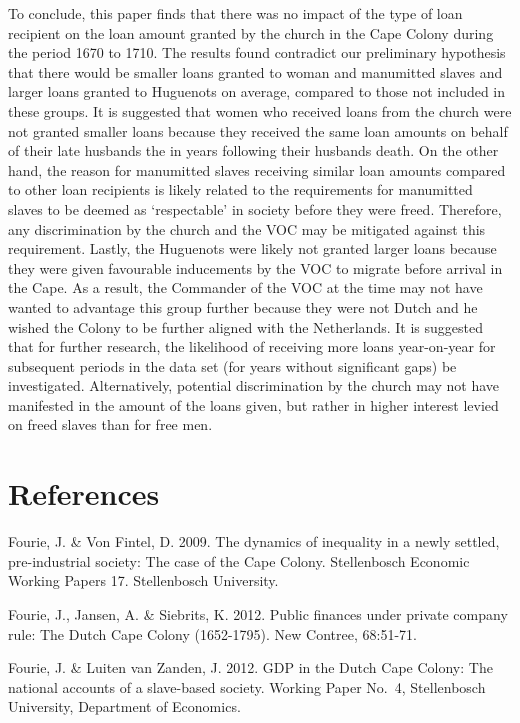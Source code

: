 \documentclass[11pt,preprint, authoryear]{elsarticle}
\numberwithin{equation}{section}
\numberwithin{figure}{section}
\numberwithin{table}{section}
\begin{document}
To conclude, this paper finds that there was no impact of the type of
loan recipient on the loan amount granted by the church in the Cape
Colony during the period 1670 to 1710. The results found contradict our
preliminary hypothesis that there would be smaller loans granted to
woman and manumitted slaves and larger loans granted to Huguenots on
average, compared to those not included in these groups. It is suggested
that women who received loans from the church were not granted smaller
loans because they received the same loan amounts on behalf of their
late husbands the in years following their husbands death. On the other
hand, the reason for manumitted slaves receiving similar loan amounts
compared to other loan recipients is likely related to the requirements
for manumitted slaves to be deemed as `respectable' in society before
they were freed. Therefore, any discrimination by the church and the VOC
may be mitigated against this requirement. Lastly, the Huguenots were
likely not granted larger loans because they were given favourable
inducements by the VOC to migrate before arrival in the Cape. As a
result, the Commander of the VOC at the time may not have wanted to
advantage this group further because they were not Dutch and he wished
the Colony to be further aligned with the Netherlands. It is suggested
that for further research, the likelihood of receiving more loans
year-on-year for subsequent periods in the data set (for years without
significant gaps) be investigated. Alternatively, potential
discrimination by the church may not have manifested in the amount of
the loans given, but rather in higher interest levied on freed slaves
than for free men.

\newpage

\hypertarget{references}{%
\section*{References}\label{references}}

Fourie, J. \& Von Fintel, D. 2009. The dynamics of inequality in a newly
settled, pre-industrial society: The case of the Cape Colony.
Stellenbosch Economic Working Papers 17. Stellenbosch University.

Fourie, J., Jansen, A. \& Siebrits, K. 2012. Public finances under
private company rule: The Dutch Cape Colony (1652-1795). New Contree,
68:51-71.

Fourie, J. \& Luiten van Zanden, J. 2012. GDP in the Dutch Cape Colony:
The national accounts of a slave-based society. Working Paper No.~4,
Stellenbosch University, Department of Economics.
\end{document}
